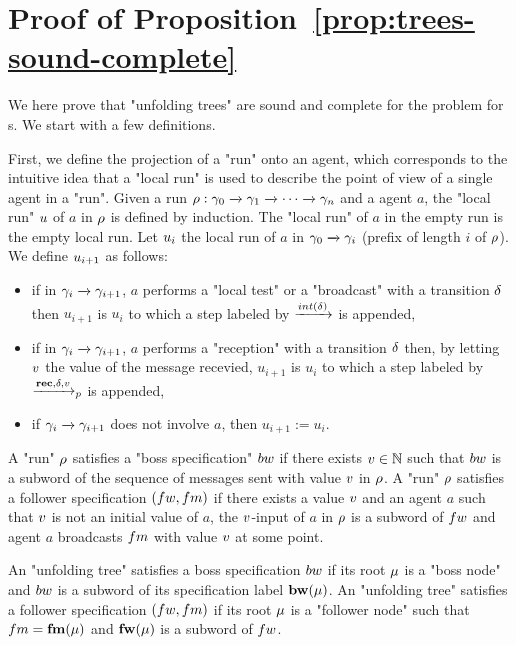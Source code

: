 \section{Proof of Proposition~\ref{prop:trees-sound-complete}}
\label{app:trees-sound-complete}

We here prove that "unfolding trees" are sound and complete for the \COVER problem for \BNRA{}s. 
We start with a few definitions. 

First, we define the projection of a "run" onto an agent, which corresponds to the intuitive idea that a "local run" is used to describe the point of view of a single agent in a "run". Given a run $\rho: \gamma_0 \xrightarrow{} \gamma_1 \xrightarrow{} \cdots \xrightarrow{}\gamma_n$ and a agent $a$, the "local run" $u$ of $a$ in $\rho$ is defined by induction. The "local run" of $a$ in the empty run is the empty local run. Let $u_i$ the local run of $a$ in $\gamma_0 \xrightarrow{} \gamma_i$ (prefix of length $i$ of $\rho$). We define $u_{i+1}$ as follows:
\begin{itemize}
\item if in $\gamma_i \xrightarrow{} \gamma_{i+1}$, $a$ performs a "local test" or a "broadcast" with a transition $\delta$ then $u_{i+1}$ is $u_i$ to which a step labeled by $\intstep{\atrans}$ is appended,
\item if in $\gamma_i \xrightarrow{} \gamma_{i+1}$, $a$ performs a "reception" with a transition $\delta$ then, by letting $v$ the value of the message recevied, $u_{i+1}$ is $u_i$ to which a step labeled by $\xrightarrow{\textbf{rec}, \delta, v}_{p}$ is appended,
\item if $\gamma_i \xrightarrow{} \gamma_{i+1}$ does not involve $a$, then $u_{i+1} := u_i$.
\end{itemize}

A "run" $\rho$ satisfies a "boss specification" $\bossspec$ if there exists $v \in \mathbb{N}$ such that $\bossspec$ is a subword of the sequence of messages sent with value $v$ in $\rho$.
A "run" $\rho$ satisfies a follower specification $(\followwordspec, \followmessagespec)$ if there exists a value $v$ and an agent $a$ such that $v$ is not an initial value of $a$, the $v$-input of $a$ in $\rho$ is a subword of $\followwordspec$ and agent $a$ broadcasts $\followmessagespec$ with value $v$ at some point.

An "unfolding tree" satisfies a boss specification $\bossspec$ if its root $\mu$ is a "boss node" and $\bossspec$ is a subword of its specification label $\mathbf{bw}(\mu)$.
An "unfolding tree" satisfies a follower specification $(\followwordspec, \followmessagespec)$ if its root $\mu$ is a "follower node" such that $\followmessagespec=\followlabelmessage{\node}$ and  $\mathbf{fw}(\mu)$ is a subword of $\followwordspec$.


